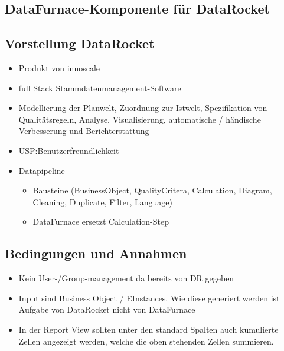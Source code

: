 \documentclass[
  language=german, %
  type=bachelor%
]{isthesis}
\begin{document}
\begin{content}
  \chapter{DataFurnace-Komponente für DataRocket}

  \section{Vorstellung DataRocket}
\label{sec:Vorstellung-DataRocket}
  \begin{itemize}
    \item Produkt von innoscale
    \item full Stack Stammdatenmanagement-Software
    \item Modellierung der Planwelt, Zuordnung zur Istwelt, Spezifikation von
      Qualitätsregeln, Analyse, Visualisierung, automatische / händische
      Verbesserung und Berichterstattung
    \item USP:\@ Benutzerfreundlichkeit 
    \item Datapipeline
      \begin{itemize}
        \item Bausteine (BusinessObject, QualityCritera, Calculation, Diagram,
          Cleaning, Duplicate, Filter, Language)
        \item DataFurnace ersetzt Calculation-Step
      \end{itemize}
  \end{itemize}

  \section{Bedingungen und Annahmen}
  \begin{itemize}
    \item Kein User-/Group-management da bereits von DR gegeben
    \item Input sind Business Object / EInstances. Wie diese generiert werden
      ist Aufgabe von DataRocket nicht von DataFurnace
    \item In der Report View sollten unter den standard Spalten auch kumulierte
      Zellen angezeigt werden, welche die oben stehenden Zellen summieren.
  \end{itemize}


\end{content}
\end{document}
